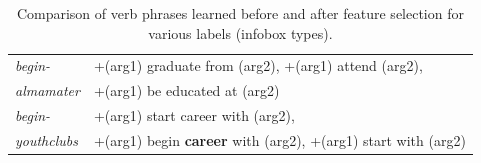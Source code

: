 \begin{table}
\begin{scriptsize}
\begin{center}
\begin{tabular}{|l|l|}
\hline
\textit{begin-} &+(arg1) graduate from (arg2), +(arg1) attend (arg2), \\
\textit{almamater}& +(arg1) be educated at (arg2) \\
\hline
\textit{begin-} &+(arg1) start career with (arg2), \\
\textit{youthclubs}& +(arg1) begin \textbf{career} with (arg2), +(arg1) start with (arg2) \\
\hline
\end{tabular}
\caption{\label{table:verbs} Comparison of verb phrases learned before and after feature selection for various labels (infobox types).}
\end{center}
\end{scriptsize}
\end{table}
\normalsize
